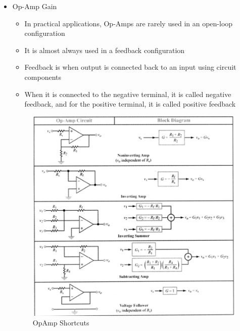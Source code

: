 \begin{itemize}
\begin{itemize}
    \end{itemize}

  \item Op-Amp Gain

    \begin{itemize}
        
      \item In practical applications, Op-Amps are rarely used in an open-loop configuration

      \item It is almost always used in a feedback configuration

      \item Feedback is when output is connected back to an input using circuit components

      \item When it is connected to the negative terminal, it is called negative feedback, and for the positive terminal, it is called positive feedback

    \end{itemize}

    \begin{figure}[h!]
      \centering
      \includegraphics[width=.9\textwidth]{Figures/OPAMPS.png}
      \caption{OpAmp Shortcuts}
      \label{fig:1}
    \end{figure}

\end{itemize}



